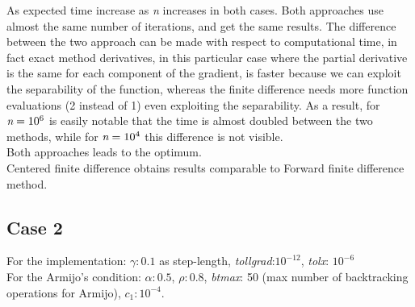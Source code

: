\documentclass{article}
\begin{document}
As expected time increase as \emph{n} increases in both cases. Both approaches use almost the same number of iterations, and get the same results. The difference between the two approach can be made with respect to computational time, in fact exact method derivatives, in this particular case where the partial derivative is the same for each component of the gradient, is faster because we can exploit the separability of the function, whereas the finite difference needs more function evaluations (2 instead of 1) even exploiting the separability. As a result, for $\emph{n}= 10^6$ is easily notable that the time is almost doubled between the two methods, while for  $\emph{n}= 10^4$ this difference is not visible.\\ Both approaches leads to the optimum.\\Centered finite difference obtains results comparable to Forward finite difference method.



\subsection{Case 2}

 For the implementation: ${\gamma:0.1 }$ as step-length, \emph{tollgrad}:$10^{-12}$, \emph{tolx}: $10^{-6}$ \\
For the Armijo's condition: $\alpha:0.5$, $\rho: 0.8$, \emph{btmax}: 50 (max number of backtracking operations for Armijo), \emph{$c_{1}: 10^{-4}$}.
\end{document}
